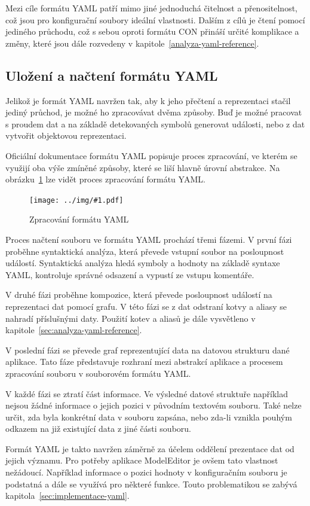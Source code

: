 \documentclass[FM,bw,DP]{tulthesis}
\newcommand{\includeimg}[2]{%
\begin{figure}[h]
	\centering
    \texttt{[image: ../img/\#1.pdf]}
    \caption{#2}
	\label{img:#1}
\end{figure}
}
\begin{document}
Mezi cíle formátu YAML patří mimo jiné jednoduchá čitelnost a přenositelnost, což jsou pro konfigurační soubory ideální vlastnosti. Dalším z cílů je čtení pomocí jediného průchodu, což s sebou oproti formátu CON přináší určité komplikace a změny, které jsou dále rozvedeny v kapitole~\ref{analyza-yaml-reference}.

\subsection{Uložení a načtení formátu YAML}

Jelikož je formát YAML navržen tak, aby k jeho přečtení a reprezentaci stačil jediný průchod, je možné ho zpracovávat dvěma způsoby. Buď je možné pracovat s proudem dat a na základě detekovaných symbolů generovat události, nebo z dat vytvořit objektovou reprezentaci.

Oficiální dokumentace formátu YAML popisuje proces zpracování, ve kterém se využijí oba výše zmíněné způsoby, které se liší hlavně úrovní abstrakce. Na obrázku~\ref{img:yaml} lze vidět proces zpracování formátu YAML.

\includeimg{yaml}{Zpracování formátu YAML}

Proces načtení souboru ve formátu YAML prochází třemi fázemi. V první fázi proběhne syntaktická analýza, která převede vstupní soubor na posloupnost událostí. Syntaktická analýza hledá symboly a hodnoty na základě syntaxe YAML, kontroluje správné odsazení a vypustí ze vstupu komentáře.

V druhé fázi proběhne kompozice, která převede posloupnost událostí na reprezentaci dat pomocí grafu. V této fázi se z dat odstraní kotvy a aliasy se nahradí příslušnými daty. Použití kotev a aliasů je dále vysvětleno v kapitole~\ref{sec:analyza-yaml-reference}.

V poslední fázi se převede graf reprezentující data na datovou strukturu dané aplikace. Tato fáze představuje rozhraní mezi abstrakcí aplikace a procesem zpracování souboru v souborovém formátu YAML.

V každé fázi se ztratí část informace. Ve výsledné datové struktuře například nejsou žádné informace o jejich pozici v původním textovém souboru. Také nelze určit, zda byla konkrétní data v souboru zapsána, nebo zda-li vznikla pouhým odkazem na již existující data z jiné části souboru.

Formát YAML je takto navržen záměrně za účelem oddělení prezentace dat od jejich významu. Pro potřeby aplikace ModelEditor je ovšem tato vlastnost nežádoucí. Například informace o pozici hodnoty v konfiguračním souboru je podstatná a dále se využívá pro některé funkce. Touto problematikou se zabývá kapitola~\ref{sec:implementace-yaml}.
\end{document}
